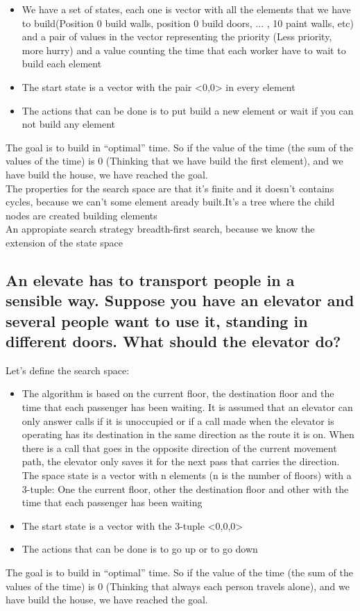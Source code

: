 \documentclass[paper=a4, fontsize=11pt]{scrartcl} %
\numberwithin{equation}{section} %
\numberwithin{figure}{section} %
\numberwithin{table}{section} %
\begin{document}
\begin{itemize}
	\item We have a set of states, each one is vector with all the elements that we have to build(Position 0 build walls, position 0 build doors, ... , 10 paint walls, etc) and a pair of values in the vector representing the priority (Less priority, more hurry) and a value counting the time that each worker have to wait to build each element
	\item The start state is a vector with the pair <0,0> in every element
	\item The actions that can be done is to put build a new element or wait if you can not build any element
\end{itemize}
The goal is to build in “optimal” time. So if the value of the time (the sum of the values of the time) is 0 (Thinking that we have build the first element), and we have build the house, we have reached the goal.\\

The properties for the search space are that it's finite and it doesn't contains cycles, because we can't some element aready built.It's a tree where the child nodes are created building elements\\

An appropiate search strategy breadth-first search, because we know the extension of the state space\\


\newpage

\subsection{An elevate has to transport people in a sensible way. Suppose you have an elevator and several people want to use it, standing in different doors. What should the elevator do?}

Let's define the search space:

\begin{itemize}
	\item The algorithm is based on the current floor, the destination floor and the time that each passenger has been waiting. It is assumed that an elevator can only answer calls if it is unoccupied or if a call made when the elevator is operating has its destination in the same direction as the route it is on. When there is a call that goes in the opposite direction of the current movement path, the elevator only saves it for the next pass that carries the direction. The space state is a vector with n elements (n is the number of floors) with a 3-tuple: One the current floor, other the destination floor and other with the time that each passenger has been waiting
	\item The start state is a vector with the 3-tuple <0,0,0>
	\item The actions that can be done is to go up or to go down
\end{itemize}
The goal is to build in “optimal” time. So if the value of the time (the sum of the values of the time) is 0 (Thinking that always each person travels alone), and we have build the house, we have reached the goal.\\
\end{document}
